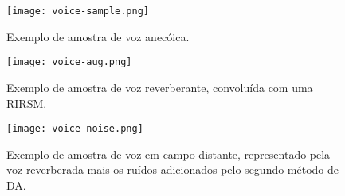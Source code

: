 \begin{figure} [H]
    \centering
    \texttt{[image: voice-sample.png]}
    \caption{Exemplo de amostra de voz anecóica.}
    \label{fig:voice-sample}
\end{figure} 

\begin{figure} [H]
    \centering
    \texttt{[image: voice-aug.png]}
    \caption{Exemplo de amostra de voz reverberante, convoluída com uma RIRSM.}
    \label{fig:voice-aug}
\end{figure} 

\begin{figure} [H]
    \centering
    \texttt{[image: voice-noise.png]}
    \caption{Exemplo de amostra de voz em campo distante, representado pela voz reverberada mais os ruídos adicionados pelo segundo método de DA.}
    \label{fig:voice-noise}
\end{figure} 